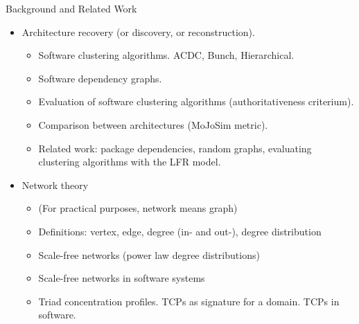 \documentclass[11pt,twocolumn,a4paper,english]{article}
\begin{document}

\begin{section}{Background and Related Work}
	\begin{itemize}
		\item Architecture recovery (or discovery, or reconstruction). 
		\begin{itemize}
			\item Software clustering algorithms. ACDC, Bunch, Hierarchical.
			\item Software dependency graphs.
			\item Evaluation of software clustering algorithms (authoritativeness criterium).
			\item Comparison between architectures (MoJoSim metric).
			\item Related work: package dependencies, random graphs, evaluating clustering algorithms with the LFR model.
		\end{itemize}
		
		\item Network theory
		\begin{itemize}
			\item (For practical purposes, network means graph)
			\item Definitions: vertex, edge, degree (in- and out-), degree distribution
			\item Scale-free networks (power law degree distributions)
			\item Scale-free networks in software systems
			\item Triad concentration profiles. TCPs as signature for a domain. TCPs in software. 
		\end{itemize}
	\end{itemize}

	
\end{section}

\end{document}
